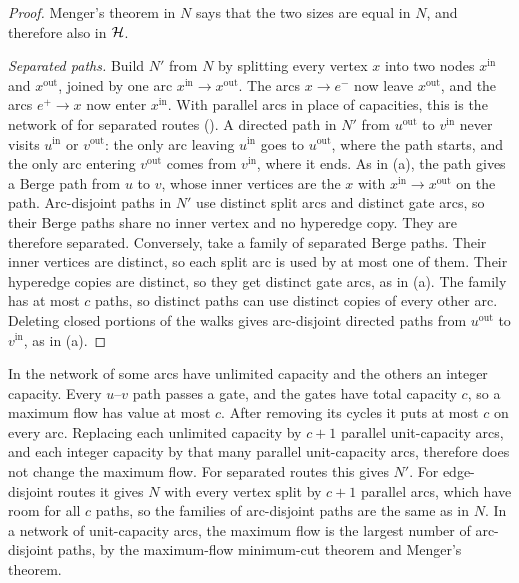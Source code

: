 \begin{proof}
Menger's theorem in $N$ says that the two sizes are equal in $N$, and therefore also in $\mathcal{H}$.

\emph{Separated paths.} Build $N'$ from $N$ by splitting every vertex $x$ into two nodes $x^{\mathrm{in}}$ and $x^{\mathrm{out}}$, joined by one arc $x^{\mathrm{in}}\to x^{\mathrm{out}}$. The arcs $x\to e^-$ now leave $x^{\mathrm{out}}$, and the arcs $e^+\to x$ now enter $x^{\mathrm{in}}$. With parallel arcs in place of capacities, this is the network of  for separated routes ().
A directed path in $N'$ from $u^{\mathrm{out}}$ to $v^{\mathrm{in}}$ never visits $u^{\mathrm{in}}$ or $v^{\mathrm{out}}$: the only arc leaving $u^{\mathrm{in}}$ goes to $u^{\mathrm{out}}$, where the path starts, and the only arc entering $v^{\mathrm{out}}$ comes from $v^{\mathrm{in}}$, where it ends. As in (a), the path gives a Berge path from $u$ to $v$, whose inner vertices are the $x$ with $x^{\mathrm{in}}\to x^{\mathrm{out}}$ on the path.
Arc-disjoint paths in $N'$ use distinct split arcs and distinct gate arcs, so their Berge paths share no inner vertex and no hyperedge copy. They are therefore separated.
Conversely, take a family of separated Berge paths. Their inner vertices are distinct, so each split arc is used by at most one of them. Their hyperedge copies are distinct, so they get distinct gate arcs, as in (a). The family has at most $c$ paths, so distinct paths can use distinct copies of every other arc. Deleting closed portions of the walks gives arc-disjoint directed paths from $u^{\mathrm{out}}$ to $v^{\mathrm{in}}$, as in (a).
\end{proof}

\begin{remark}[Capacities]\label{rem:capacities}
In the network of  some arcs have unlimited capacity and the others an integer capacity.
Every $u$--$v$ path passes a gate, and the gates have total capacity $c$, so a maximum flow has value at most $c$. After removing its cycles it puts at most $c$ on every arc.
Replacing each unlimited capacity by $c+1$ parallel unit-capacity arcs, and each integer capacity by that many parallel unit-capacity arcs, therefore does not change the maximum flow.
For separated routes this gives $N'$. For edge-disjoint routes it gives $N$ with every vertex split by $c+1$ parallel arcs, which have room for all $c$ paths, so the families of arc-disjoint paths are the same as in $N$.
In a network of unit-capacity arcs, the maximum flow is the largest number of arc-disjoint paths, by the maximum-flow minimum-cut theorem and Menger's theorem.
\end{remark}

